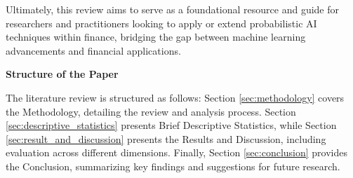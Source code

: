 Ultimately, this review aims to serve as a foundational resource and guide for researchers and practitioners looking to apply or extend probabilistic AI techniques within finance, bridging the gap between machine learning advancements and financial applications.

\textbf{Structure of the Paper}\nopagebreak

The literature review is structured as follows: Section \ref{sec:methodology} covers the Methodology, detailing the review and analysis process. Section \ref{sec:descriptive_statistics} presents Brief Descriptive Statistics, while Section \ref{sec:result_and_discussion} presents the Results and Discussion, including evaluation across different dimensions. Finally, Section \ref{sec:conclusion} provides the Conclusion, summarizing key findings and suggestions for future research.  